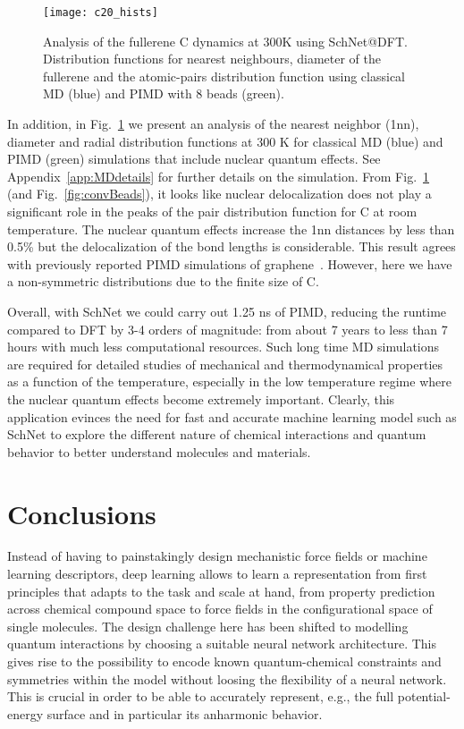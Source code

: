 \documentclass[aip,jcp,reprint,graphicx]{revtex4-1}
\newcommand{\new}[1]{#1}
\begin{document}
\begin{figure}
	\texttt{[image: c20\_hists]}
	\caption{Analysis of the fullerene C dynamics at 300K using SchNet@DFT. Distribution functions for nearest neighbours, diameter of the fullerene and the atomic-pairs distribution function using classical MD (blue) and PIMD with 8 beads (green).\label{fig:c20mdb}}
\end{figure}
In addition, in Fig.~\ref{fig:c20mdb} we present an analysis of the nearest neighbor (1nn), diameter and radial distribution functions at 300 K for classical MD (blue) and PIMD (green) simulations that include nuclear quantum effects. \new{See Appendix~\ref{app:MDdetails} for further details on the simulation. From Fig.~\ref{fig:c20mdb} (and Fig.~\ref{fig:convBeads}), it looks like nuclear delocalization does not play a significant role in the peaks of the pair distribution function  for C at room temperature. The nuclear quantum effects increase the 1nn distances by less than 0.5\% but the delocalization of the bond lengths is considerable. This result agrees with previously reported PIMD simulations of graphene~\citep{Igor2017}. However, here we have a non-symmetric distributions due to the finite size of C.}

Overall, with SchNet we could carry out 1.25 ns of PIMD, reducing the runtime compared to DFT by 3-4 orders of magnitude: from about 7 years to \new{less than 7 hours with much less computational resources. Such long time MD simulations are required for detailed studies of mechanical and thermodynamical properties as a function of the temperature, especially in the low temperature regime where the nuclear quantum effects become extremely important}. Clearly, this application evinces the need for fast and accurate machine learning model such as SchNet to explore the different nature of chemical interactions and quantum behavior to better understand molecules and materials.

\section{Conclusions}
\label{sec:conclusions}
Instead of having to painstakingly design mechanistic force fields or machine learning descriptors, deep learning allows to learn a representation from first principles that adapts to the task and scale at hand, from property prediction across chemical compound space to force fields in the configurational space of single molecules.
The design challenge here has been shifted to modelling quantum interactions by choosing a suitable neural network architecture.
This gives rise to the possibility to encode known quantum-chemical constraints and symmetries within the model without loosing the flexibility of a neural network.
This is crucial in order to be able to accurately represent, e.g., the full potential-energy surface and in particular its anharmonic behavior.
\end{document}
